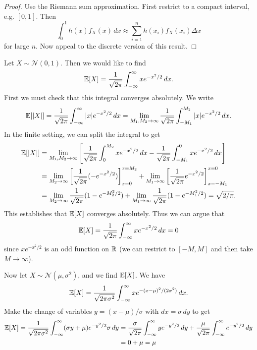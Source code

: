 \begin{proof}
  Use the Riemann sum approximation. First
  restrict to a compact interval, e.g. $[0, 1]$.
  Then
  \[
    \int_0^1 h(x) f_X(x) \, dx
    \approx \sum_{i = 1}^n h(x_i) f_X(x_i) \Delta x
  \]
  for large $n$. Now appeal to the discrete
  version of this result.
\end{proof}

\begin{example}
  Let $X \sim \mathcal{N}(0, 1)$. Then we would like
  to find
  \[
    \mathbb{E}[X] = \frac{1}{\sqrt{2\pi}} \int_{-\infty}^\infty x e^{-x^2 / 2} \, dx.
  \]
  First we must check that this integral
  converges absolutely. We write
  \[
    \mathbb{E}[|X|]
    = \frac{1}{\sqrt{2\pi}} \int_{-\infty}^\infty |x| e^{-x^2 / 2}\, dx
    = \lim_{M_1, M_2 \to \infty}
    \frac{1}{\sqrt{2\pi}} \int_{-M_1}^{M_2} |x| e^{-x^2 / 2} \, dx.
  \]
  In the finite setting, we can split the integral to
  get
  \begin{align*}
    \mathbb{E}[|X|]
    &= \lim_{M_1, M_2 \to \infty}
    \left[
      \frac{1}{\sqrt{2\pi}} \int_0^{M_2} x e^{-x^2 / 2} \, dx
      - \frac{1}{\sqrt{2\pi}} \int_{-M_1}^0 x e^{-x^2 / 2} \, dx
    \right] \\
    &= \lim_{M_2 \to \infty} \left[\frac{1}{\sqrt{2\pi}} (-e^{-x^2 / 2})\right]_{x = 0}^{x = M_2}
    + \lim_{M_1 \to \infty} \left[\frac{1}{\sqrt{2\pi}} e^{-x^2 / 2}\right]_{x = -M_1}^{x = 0} \\
    &= \lim_{M_2 \to \infty} \frac{1}{\sqrt{2\pi}} (1 - e^{-M_2^2 / 2})
    + \lim_{M_1 \to \infty} \frac{1}{\sqrt{2\pi}} (1 - e^{-M_1^2 / 2})
    = \sqrt{2 / \pi}.
  \end{align*}
  This establishes that $\mathbb{E}[X]$ converges
  absolutely. Thus we can argue that
  \[
    \mathbb{E}[X] = \frac{1}{\sqrt{2\pi}} \int_{-\infty}^\infty x e^{-x^2 / 2} \, dx = 0
  \]
  since $x e^{-x^2 / 2}$ is an odd function on $\mathbb{R}$
  (we can restrict to $[-M, M]$
  and then take $M \to \infty$).
\end{example}

\begin{example}
  Now let $X \sim \mathcal{N}(\mu, \sigma^2)$, and
  we find $\mathbb{E}[X]$. We have
  \[
    \mathbb{E}[X] = \frac{1}{\sqrt{2\pi \sigma^2}} \int_{-\infty}^\infty x e^{-(x - \mu)^2 / (2\sigma^2)} \, dx.
  \]
  Make the change of variables $y = (x - \mu) / \sigma$
  with $dx = \sigma\, dy$ to get
  \begin{align*}
    \mathbb{E}[X]
    = \frac{1}{\sqrt{2\pi \sigma^2}}
    \int_{-\infty}^\infty (\sigma y + \mu) e^{-y^2 / 2} \sigma\, dy
    &= \frac{\sigma}{\sqrt{2\pi}} \int_{-\infty}^\infty y e^{-y^2 / 2} \, dy + \frac{\mu}{\sqrt{2\pi}} \int_{-\infty}^\infty e^{-y^2 / 2} \, dy \\
    &= 0 + \mu = \mu
  \end{align*}
\end{example}

